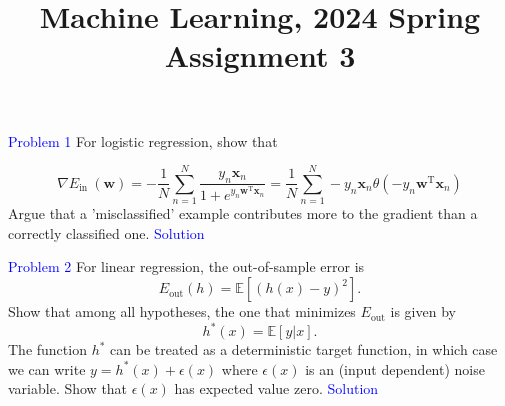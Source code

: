 \documentclass{article}
\title{Machine Learning, 2024 Spring\\Assignment 3}
\begin{document}
\maketitle

\begin{abstract}

\end{abstract}

\textcolor{blue}{Problem 1}
For logistic regression, show that

\begin{equation}
    \nabla E_{\text {in }}(\mathbf{w})  =-\frac{1}{N} \sum_{n=1}^{N} \frac{y_{n} \mathbf{x}_{n}}{1+e^{y_{n} \mathbf{w}^{\mathrm{T}} \mathbf{x}_{n}}}  
 =\frac{1}{N} \sum_{n=1}^{N}-y_{n} \mathbf{x}_{n} \theta\left(-y_{n} \mathbf{w}^{\mathrm{T}} \mathbf{x}_{n}\right)
\end{equation}
Argue that a 'misclassified' example contributes more to the gradient than a correctly classified one.
\textcolor{blue}{Solution}


\newpage


\textcolor{blue}{Problem 2}
For linear regression, the out-of-sample error is 
\begin{equation}
    E_{\text{out}}(h)=\mathbb{E}[{(h(x)-y)}^2].
\end{equation}
Show that among all hypotheses, the one that minimizes $E_{\text{out}}$ is given by
\begin{equation}
    h^*(x)=\mathbb{E}[y|x].
\end{equation}
The function $h^*$ can be treated as a deterministic target function, in which case we can write $y=h^*(x)+\epsilon(x)$ where $\epsilon(x)$ is an (input dependent) noise variable. Show that $\epsilon(x)$ has expected value zero.
\newline
\textcolor{blue}{Solution}

\newpage
\end{document}
